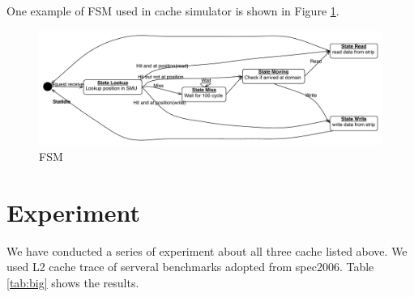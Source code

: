 \documentclass[11pt]{article}
\begin{document}
One example of FSM used in cache simulator is shown in Figure \ref{fig:auto}.


\begin{figure}[h]
\centering
\includegraphics[width=400pt]{fig5.pdf}
\caption{FSM}
\label{fig:auto}
\end{figure}


\section{Experiment}

We have conducted a series of experiment about all three cache listed above. We used L2 cache trace of serveral benchmarks adopted from spec2006. Table \ref{tab:big} shows the results.
\end{document}
